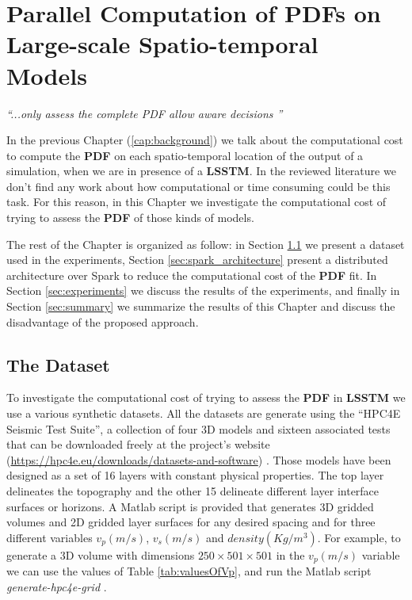 \chapter{Parallel Computation of PDFs on Large-scale Spatio-temporal Models}\label{cap:ji}

\begin{flushright}
	\textit{``...only assess the complete PDF allow aware decisions ''\\
	\cite{Lampasi2006}}
\end{flushright}

In the previous Chapter (\ref{cap:background}) we talk about the computational cost to compute the \textbf{PDF} on each spatio-temporal location of the output of a simulation, when we are in presence of a \textbf{LSSTM}. In the reviewed literature we don't find any work about how computational or time consuming could be this task. For this reason, in this Chapter we investigate the computational cost of trying to assess the \textbf{PDF} of those kinds of models.  

The rest of the Chapter is organized as follow: in Section \ref{sec:dataset} we present a dataset used in the experiments, Section \ref{sec:spark_architecture} present a distributed architecture over Spark to reduce the computational cost of the \textbf{PDF} fit. In Section \ref{sec:experiments} we discuss the results of the experiments, and finally in Section \ref{sec:summary} we summarize the results of this Chapter and discuss the disadvantage of the proposed approach.

\section{The Dataset}\label{sec:dataset}
To investigate the computational cost of trying to assess the \textbf{PDF} in \textbf{LSSTM} we use a various synthetic datasets. All the datasets are generate using the “HPC4E Seismic Test Suite”, a collection of four 3D models and sixteen associated tests that can be downloaded freely at the project's website (\url{https://hpc4e.eu/downloads/datasets-and-software}) \cite{deLaPuente2015}. Those models have been designed as a set of 16 layers with constant physical properties. The top layer delineates the topography and the other 15 delineate different layer interface surfaces or horizons. A Matlab script is provided that generates 3D gridded volumes and 2D gridded layer surfaces for any desired spacing and for three different variables $v_{p}(m/s)$, $v_{s}(m/s)$ and $density(Kg/m^3)$. For example, to generate a 3D volume with dimensions $250\times501\times501$ in the $v_{p}(m/s)$ variable we can use the values of Table \ref{tab:valuesOfVp}, and run the Matlab script \textit{generate-hpc4e-grid} . 

